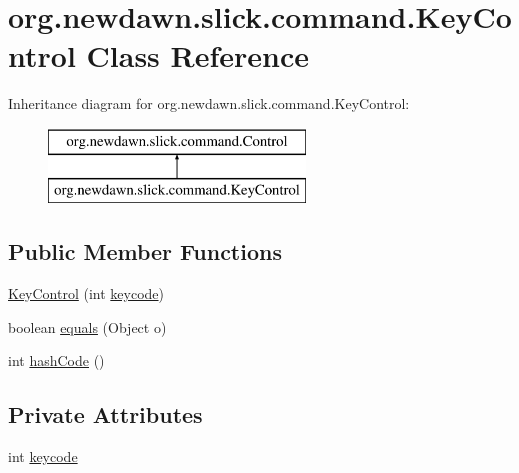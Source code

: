 \hypertarget{classorg_1_1newdawn_1_1slick_1_1command_1_1_key_control}{}\section{org.\+newdawn.\+slick.\+command.\+Key\+Control Class Reference}
\label{classorg_1_1newdawn_1_1slick_1_1command_1_1_key_control}
Inheritance diagram for org.\+newdawn.\+slick.\+command.\+Key\+Control\+:\begin{figure}[H]
\begin{center}
\leavevmode
\includegraphics[height=2.000000cm]{classorg_1_1newdawn_1_1slick_1_1command_1_1_key_control}
\end{center}
\end{figure}
\subsection*{Public Member Functions}
\begin{DoxyCompactItemize}
\item 
\mbox{\hyperlink{classorg_1_1newdawn_1_1slick_1_1command_1_1_key_control_ae585fe955bcc9da50286f092dd9ee7f4}{Key\+Control}} (int \mbox{\hyperlink{classorg_1_1newdawn_1_1slick_1_1command_1_1_key_control_ad8edd8c70be8e811bbc7049f9fea0746}{keycode}})
\item 
boolean \mbox{\hyperlink{classorg_1_1newdawn_1_1slick_1_1command_1_1_key_control_af2e1c999f4d9231969618018e8838b2f}{equals}} (Object o)
\item 
int \mbox{\hyperlink{classorg_1_1newdawn_1_1slick_1_1command_1_1_key_control_a380aee4004516247655bd52f27c692a0}{hash\+Code}} ()
\end{DoxyCompactItemize}
\subsection*{Private Attributes}
\begin{DoxyCompactItemize}
\item 
int \mbox{\hyperlink{classorg_1_1newdawn_1_1slick_1_1command_1_1_key_control_ad8edd8c70be8e811bbc7049f9fea0746}{keycode}}
\end{DoxyCompactItemize}


